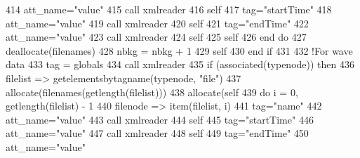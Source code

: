 \begin{DoxyCode}
414                 att\_name=\textcolor{stringliteral}{"value"}
415                 \textcolor{keyword}{call }xmlreader%
416                 self%
417                 tag=\textcolor{stringliteral}{"startTime"}
418                 att\_name=\textcolor{stringliteral}{"value"}
419                 \textcolor{keyword}{call }xmlreader%
420                 self%
421                 tag=\textcolor{stringliteral}{"endTime"}
422                 att\_name=\textcolor{stringliteral}{"value"}
423                 \textcolor{keyword}{call }xmlreader%
424                 self%
425                 self%
426 \textcolor{keywordflow}{            end do}
427             \textcolor{keyword}{deallocate}(filenames)
428             nbkg = nbkg + 1
429             self%
430 \textcolor{keywordflow}{        end if}
431 
432         \textcolor{comment}{!For wave data}
433         tag = globals%
434         \textcolor{keyword}{call }xmlreader%
435         \textcolor{keywordflow}{if} (\textcolor{keyword}{associated}(typenode)) \textcolor{keywordflow}{then}
436             filelist => getelementsbytagname(typenode, \textcolor{stringliteral}{"file"})
437             \textcolor{keyword}{allocate}(filenames(getlength(filelist)))
438             \textcolor{keyword}{allocate}(self%
439             \textcolor{keywordflow}{do} i = 0, getlength(filelist) - 1
440                 filenode => item(filelist, i)
441                 tag=\textcolor{stringliteral}{"name"}
442                 att\_name=\textcolor{stringliteral}{"value"}
443                 \textcolor{keyword}{call }xmlreader%
444                 self%
445                 tag=\textcolor{stringliteral}{"startTime"}
446                 att\_name=\textcolor{stringliteral}{"value"}
447                 \textcolor{keyword}{call }xmlreader%
448                 self%
449                 tag=\textcolor{stringliteral}{"endTime"}
450                 att\_name=\textcolor{stringliteral}{"value"}

\end{DoxyCode}

